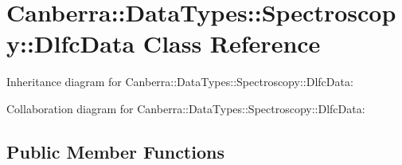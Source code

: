 \hypertarget{class_canberra_1_1_data_types_1_1_spectroscopy_1_1_dlfc_data}{}\section{Canberra\+:\+:Data\+Types\+:\+:Spectroscopy\+:\+:Dlfc\+Data Class Reference}
\label{class_canberra_1_1_data_types_1_1_spectroscopy_1_1_dlfc_data}


Inheritance diagram for Canberra\+:\+:Data\+Types\+:\+:Spectroscopy\+:\+:Dlfc\+Data\+:


Collaboration diagram for Canberra\+:\+:Data\+Types\+:\+:Spectroscopy\+:\+:Dlfc\+Data\+:
\subsection*{Public Member Functions}

